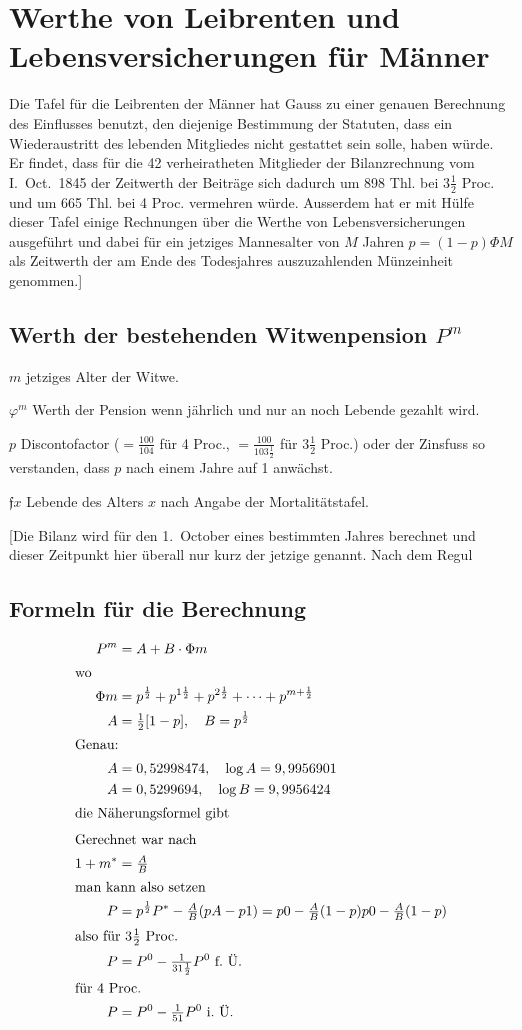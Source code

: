 \documentclass[12pt,a4paper]{article}
\begin{document}
\section*{Werthe von Leibrenten und Lebensversicherungen für Männer}

Die Tafel für die Leibrenten der Männer hat Gauss zu einer genauen Berechnung des Einflusses benutzt, den diejenige Bestimmung der Statuten, dass ein Wiederaustritt des lebenden Mitgliedes nicht gestattet sein solle, haben würde. Er findet, dass für die 42 verheiratheten Mitglieder der Bilanzrechnung vom I.~Oct.~1845 der Zeitwerth der Beiträge sich dadurch um 898 Thl. bei $3\frac{1}{2}$ Proc. und um 665 Thl. bei 4 Proc. vermehren würde. Ausserdem hat er mit Hülfe dieser Tafel einige Rechnungen über die Werthe von Lebensversicherungen ausgeführt und dabei für ein jetziges Mannesalter von $M$ Jahren $p = (1-p)\Phi M$ als Zeitwerth der am Ende des Todesjahres auszuzahlenden Münzeinheit genommen.]

\subsection*{Werth der bestehenden Witwenpension $P^m$}

$m$ jetziges Alter der Witwe.

$\varphi^m$ Werth der Pension wenn jährlich und nur an noch Lebende gezahlt wird.

$p$ Discontofactor ($= \frac{100}{104}$ für 4 Proc., $= \frac{100}{103\frac{1}{2}}$ für $3\frac{1}{2}$ Proc.) oder der Zinsfuss so verstanden, dass $p$ nach einem Jahre auf 1 anwächst.

$\mathfrak{f}x$ Lebende des Alters $x$ nach Angabe der Mortalitätstafel.

[Die Bilanz wird für den 1.~October eines bestimmten Jahres berechnet und dieser Zeitpunkt hier überall nur kurz der jetzige genannt. Nach dem Regul

\subsection*{Formeln für die Berechnung}

\begin{align}
P^m &= A + B \cdot \Phi m \\
\intertext{wo}
\Phi m &= p^{\frac{1}{2}} + p^{1\frac{1}{2}} + p^{2\frac{1}{2}} + \cdots + p^{m+\frac{1}{2}} \\
A &= \tfrac{1}{2}[1 - p], \quad B = p^{\frac{1}{2}} \\
\intertext{Genau:} A &= 0,52998474, \quad \log A = 9,9956901 \\
A &= 0,5299694, \quad \log B = 9,9956424 \\
\intertext{die Näherungsformel gibt}
\intertext{Gerechnet war nach} 1 + m^* &= \tfrac{A}{B} \\
\intertext{man kann also setzen} P &= p^{\frac{1}{2}} P^* - \tfrac{A}{B}(pA - p1) = p0 - \tfrac{A}{B}(1-p)p0 - \tfrac{A}{B}(1-p) \\
\intertext{also für $3\frac{1}{2}$ Proc.} P &= P^0 - \tfrac{1}{31\frac{1}{2}} P^0 \text{ f.~Ü.} \\
\intertext{für 4 Proc.} P &= P^0 - \tfrac{1}{51} P^0 \text{ i.~Ü.}
\end{align}
\end{document}
